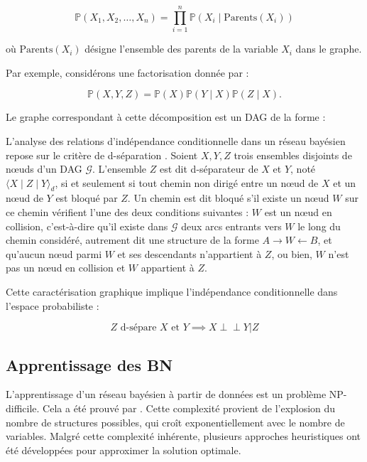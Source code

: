 \documentclass{article}
\newcommand\independent{\perp\!\!\!\!\!\!\perp}
\begin{document}
$$
    \mathbb{P}(X_1, X_2, \dots, X_n) = \prod_{i=1}^{n} \mathbb{P}(X_i \mid \text{Parents}(X_i))
$$

où $\text{Parents}(X_i)$ désigne l’ensemble des parents de la variable $X_i$ dans le graphe.

Par exemple, considérons une factorisation donnée par :

$$
    \mathbb{P}(X, Y, Z) = \mathbb{P}(X) \mathbb{P}(Y \mid X) \mathbb{P}(Z \mid X).
$$

Le graphe correspondant à cette décomposition est un DAG de la forme :

\begin{center}
\end{center}


L'analyse des relations d'indépendance conditionnelle dans un réseau bayésien repose sur le critère de
d-séparation \cite{10.5555/534975}. Soient $X, Y, Z$ trois ensembles disjoints de nœuds d'un DAG $\mathcal{G}$.
L'ensemble $Z$ est dit d-séparateur de $X$ et $Y$, noté $\langle X \mid Z \mid Y \rangle_d$, si et seulement si
tout chemin non dirigé entre un nœud de $X$ et un nœud de $Y$ est bloqué par $Z$. Un chemin est dit bloqué s'il
existe un nœud $W$ sur ce chemin vérifient l'une des deux conditions suivantes : $W$ est un nœud en collision,
c'est-à-dire qu'il existe dans $\mathcal{G}$ deux arcs entrants vers $W$ le long du chemin considéré,
autrement dit une structure de la forme $A \to W \gets B$, et qu'aucun nœud parmi $W$ et ses descendants n'appartient
à $Z$, ou bien, $W$ n'est pas un nœud en collision et $W$ appartient à $Z$.

Cette caractérisation graphique implique l'indépendance conditionnelle dans l'espace probabiliste :

$$
    Z \text{ d-sépare } X \text{ et } Y \implies X \independent Y | Z
$$

\subsection{Apprentissage des BN}

L'apprentissage d'un réseau bayésien à partir de données est un problème NP-difficile. Cela a été prouvé par
\citet{chickering1996learning}. Cette complexité provient de l'explosion du nombre de structures possibles,
qui croît exponentiellement avec le nombre de variables. Malgré cette complexité inhérente, plusieurs approches
heuristiques ont été développées pour approximer la solution optimale.
\end{document}
